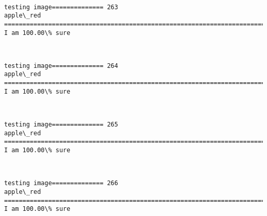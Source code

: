 \documentclass[11pt]{article}
\begin{document}
    \begin{center}
    \end{center}
    { \hspace*{\fill} \\}
    
    \begin{Verbatim}[commandchars=\\\{\}]
testing image============== 263
apple\_red
============================================================================
I am 100.00\% sure

    \end{Verbatim}

    \begin{center}
    \end{center}
    { \hspace*{\fill} \\}
    
    \begin{Verbatim}[commandchars=\\\{\}]
testing image============== 264
apple\_red
============================================================================
I am 100.00\% sure

    \end{Verbatim}

    \begin{center}
    \end{center}
    { \hspace*{\fill} \\}
    
    \begin{Verbatim}[commandchars=\\\{\}]
testing image============== 265
apple\_red
============================================================================
I am 100.00\% sure

    \end{Verbatim}

    \begin{center}
    \end{center}
    { \hspace*{\fill} \\}
    
    \begin{Verbatim}[commandchars=\\\{\}]
testing image============== 266
apple\_red
============================================================================
I am 100.00\% sure

    \end{Verbatim}
\end{document}
